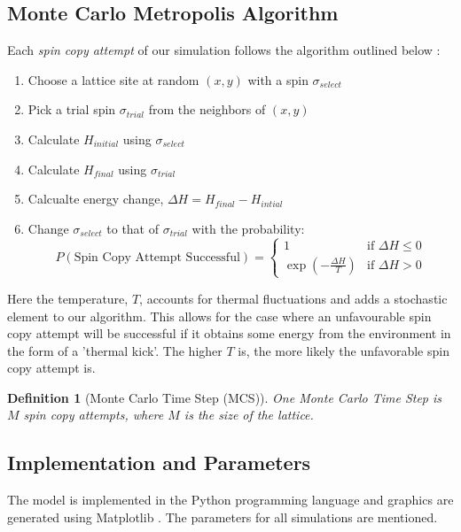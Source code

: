 \documentclass[12pt]{article}
\newtheorem{definition}{Definition}
\begin{document}
\subsection{Monte Carlo Metropolis Algorithm}
Each \emph{spin copy attempt} of our simulation follows the algorithm outlined below \cite{Glazier2007}:

\begin{enumerate}
  \item Choose a lattice site at random $(x,y)$ with a spin $\sigma_{select}$
  \item Pick a trial spin $\sigma_{trial}$ from the neighbors of $(x,y)$
  \item Calculate $H_{initial}$ using $\sigma_{select}$
  \item Calculate $H_{final}$ using $\sigma_{trial}$
  \item Calcualte energy change, $\Delta H = H_{final} - H_{intial}$
  \item{ Change $\sigma_{select}$ to that of $\sigma_{trial}$ with the probability:
  \begin{equation}
 		P(\text{Spin Copy Attempt Successful}) =
  	\begin{cases}
   		1 & \text{if } \Delta H \leq 0 \\
   		\exp{(-\frac{\Delta H}{T})}       & \text{if } \Delta H > 0
  	\end{cases}
  	\label{p_attempt_success}
	\end{equation}
}
\end{enumerate}

Here the temperature, $T$, accounts for thermal fluctuations and adds a stochastic element to our algorithm. This allows for the case where an unfavourable spin copy attempt will be successful if it obtains some energy from the environment in the form of a 'thermal kick'. The higher $T$ is, the more likely the unfavorable spin copy attempt is.

\begin{definition}[Monte Carlo Time Step (MCS)] One Monte Carlo Time Step is $M$ spin copy attempts, where $M$ is the size of the lattice.
\end{definition}

\subsection{Implementation and Parameters}
The model is implemented in the Python programming language and graphics are generated using Matplotlib \cite{matplotlib}. The parameters for all simulations are mentioned.
\end{document}
